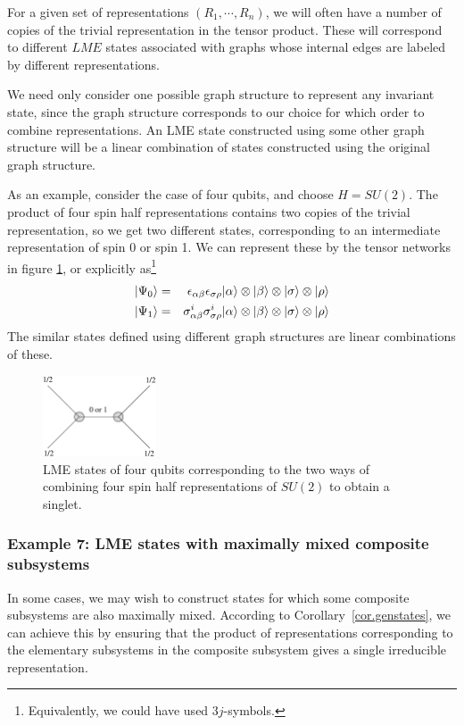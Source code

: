\documentclass[12pt]{article}
\theoremstyle{definition}
\newcommand{\bea}{\begin{eqnarray}}
\newcommand{\eea}{\end{eqnarray}}
\begin{document}
For a given set of representations $(R_1, \cdots, R_n)$, we will often have a number of copies of the trivial representation in the tensor product. These will correspond to different $LME$ states associated with graphs whose internal edges are labeled by different representations.

We need only consider one possible graph structure to represent any invariant state, since the graph structure corresponds to our choice for which order to combine representations. An LME state constructed using some other graph structure will be a linear combination of states constructed using the original graph structure.

As an example, consider the case of four qubits, and choose $H = SU(2)$. The product of four spin half representations contains two copies of the trivial representation, so we get two different states, corresponding to an intermediate representation of spin 0 or spin 1. We can represent these by the tensor networks in figure \ref{qubit4simple}, or explicitly as\footnote{Equivalently, we could have used $3j$-symbols.}
\bea
|\Psi_0 \rangle &=& \epsilon_{\alpha \beta} \epsilon_{\sigma \rho} | \alpha \rangle  \otimes |\beta \rangle  \otimes |\sigma \rangle  \otimes |\rho \rangle \cr
|\Psi_1 \rangle &=& \sigma^i_{\alpha \beta} \sigma^i_{\sigma \rho} | \alpha \rangle  \otimes |\beta \rangle  \otimes |\sigma \rangle  \otimes |\rho \rangle
\eea
The similar states defined using different graph structures are linear combinations of these.

\begin{figure}
\centering
\includegraphics[width=0.3\textwidth]{qubit4simple.eps}
\caption{LME states of four qubits corresponding to the two ways of combining four spin half representations of $SU(2)$ to obtain a singlet.}
\label{qubit4simple}
\end{figure}


\subsubsection*{Example 7: LME states with maximally mixed composite subsystems}

In some cases, we may wish to construct states for which some composite subsystems are also maximally mixed. According to Corollary~\ref{cor.genstates}, we can achieve this by ensuring that the product of representations corresponding to the elementary subsystems in the composite subsystem gives a single irreducible representation.
\end{document}

